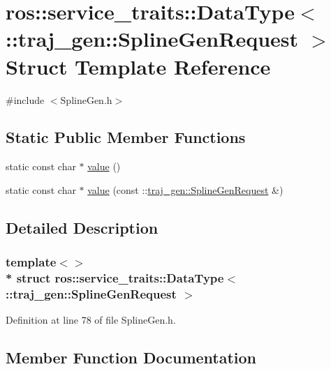 \hypertarget{structros_1_1service__traits_1_1_data_type_3_01_1_1traj__gen_1_1_spline_gen_request_01_4}{}\section{ros\+:\+:service\+\_\+traits\+:\+:Data\+Type$<$ \+:\+:traj\+\_\+gen\+:\+:Spline\+Gen\+Request $>$ Struct Template Reference}
\label{structros_1_1service__traits_1_1_data_type_3_01_1_1traj__gen_1_1_spline_gen_request_01_4}


{\ttfamily \#include $<$Spline\+Gen.\+h$>$}

\subsection*{Static Public Member Functions}
\begin{DoxyCompactItemize}
\item 
static const char $\ast$ \hyperlink{structros_1_1service__traits_1_1_data_type_3_01_1_1traj__gen_1_1_spline_gen_request_01_4_ad03f668be543ebe2bcbf86fcdf5e9ada}{value} ()
\item 
static const char $\ast$ \hyperlink{structros_1_1service__traits_1_1_data_type_3_01_1_1traj__gen_1_1_spline_gen_request_01_4_a3c13cdfe6379ae122c7189f0faff78b6}{value} (const \+::\hyperlink{namespacetraj__gen_a61c65203f503c18d4b3cb68b9ee74a74}{traj\+\_\+gen\+::\+Spline\+Gen\+Request} \&)
\end{DoxyCompactItemize}


\subsection{Detailed Description}
\subsubsection*{template$<$$>$\\*
struct ros\+::service\+\_\+traits\+::\+Data\+Type$<$ \+::traj\+\_\+gen\+::\+Spline\+Gen\+Request $>$}



Definition at line 78 of file Spline\+Gen.\+h.



\subsection{Member Function Documentation}
